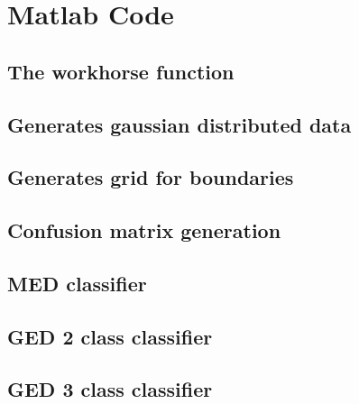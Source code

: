 \appendix
\newpage

\section{Matlab Code}
\subsection{The workhorse function}


\subsection{Generates gaussian distributed data}


\subsection{Generates grid for boundaries}


\subsection{Confusion matrix generation}


\subsection{MED classifier}


\subsection{GED 2 class classifier}


\subsection{GED 3 class classifier}




